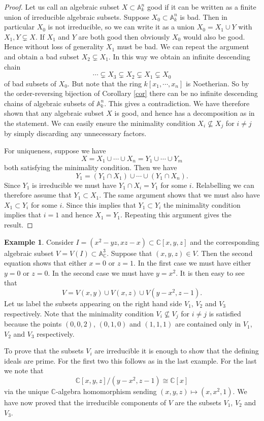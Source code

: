 \documentclass [12pt,oneside,a4paper,mathscr]{amsart}
\theoremstyle{definition}
\newtheorem{example}[thm]{Example}
\newcommand {\A}{\mathbb A}
\newcommand {\C}{\mathbb C}
\newcommand{\isom}{\cong}
\begin{document}
\begin{proof}
Let us call  an algebraic subset $X\subset \A^n_k$  good if it can be written as a finite union of irreducible algebraic subsets. 
Suppose $X_0\subset \A^n_k$  is bad. Then in particular $X_0$ is not irreducible, so we 
 can write it as a union $X_0=X_1\cup Y$ with $X_1,Y\subsetneq X$. If $X_1$ and $Y$ are both good then obviously $X_0$ would also be good. Hence without loss of generality $X_1$ must be bad. We can repeat the argument and obtain a bad subset $X_2\subsetneq X_1$. In this way we obtain an infinite descending chain
\[  \cdots \subsetneq X_3\subsetneq X_2 \subsetneq X_1 \subsetneq X_0\]
 of bad subsets of $X_0$. But note that the ring $k[x_1,\cdots,x_n]$ is Noetherian.  So by the order-reversing bijection of Corollary \ref{cor} there can be no infinite descending chains of algebraic subsets of $\A^n_k$. This gives a contradiction.
We have therefore shown that any algebraic subset $X$ is good, and hence has a decomposition as in the statement. We can easily ensure the minimality condition $X_i\not\subseteq X_j$ for $i\neq j$ by simply discarding any unnecessary factors.

For uniqueness, suppose we have
\[X= X_1\cup \cdots \cup X_n=Y_1 \cup \cdots \cup Y_m\]
both satisfying the minimality condition. Then we have
\[Y_1=(Y_1\cap X_1) \cup \cdots \cup (Y_1\cap X_n).\]
Since $Y_1$ is irreducible we must have $Y_1\cap X_i=Y_1$ for some $i$. Relabelling we can therefore assume that $Y_1\subset X_1$.
The same argument shows that we must also have $X_1\subset Y_i$ for some $i$. Since this implies that $Y_1\subset Y_i$ the minimality condition implies that $i=1$ and hence $X_1=Y_1$.
Repeating this argument gives the result.
\end{proof}







\begin{example}
Consider $I=(x^2-yz, xz-x)\subset \C[x,y,z]$ and the corresponding algebraic subset $V=V(I)\subset \A^3_\C$. Suppose that $(x,y,z)\in V$. Then the second equation shows that either $x=0$ or $z=1$. In the first case we must have either $y=0$ or $z=0$. In the second case we must have $y=x^2$. It is then easy to see that
\[V=V(x,y)\cup V(x,z) \cup V(y-x^2,z-1).\]
Let us label the subsets appearing on the right hand side $V_1$, $V_2$ and  $V_3$ respectively. Note that the minimality condition $V_i\not\subseteq V_j$ for $i\neq j$ is satisfied because the points $(0,0,2)$, $(0,1,0)$ and $(1,1,1)$ are contained only in $V_1$, $V_2$ and $V_3$ respectively. 

To prove that the subsets $V_i$ are irreducible it is enough to show that the defining ideals are prime. For the first two this follows as in the last example. For the last we note that
\[\C[x,y,z]/(y-x^2,z-1) \isom \C[x]\]
via the unique $\C$-algebra homomorphism sending $(x,y,z) \mapsto (x,x^2,1)$. We have now proved that the irreducible components of $V$ are the subsets $V_1$, $V_2$ and $V_3$.
\end{example}
\end{document}
